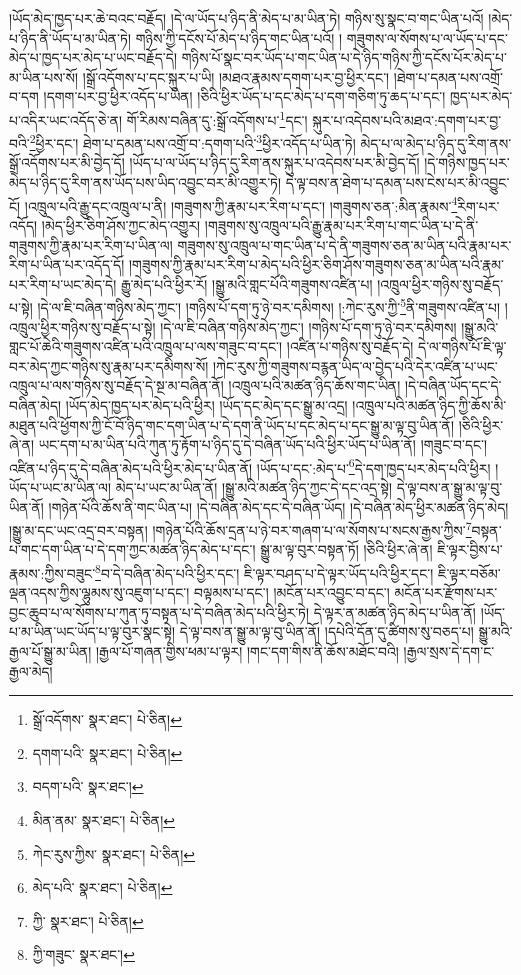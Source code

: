 །ཡོད་མེད་ཁྱད་པར་ཆེ་བའང་བརྗོད། །དེ་ལ་ཡོད་པ་ཉིད་ནི་མེད་པ་མ་ཡིན་ཏེ། གཉིས་སུ་སྣང་བ་གང་ཡིན་པའོ། །མེད་པ་ཉིད་ནི་ཡོད་པ་མ་ཡིན་ཏེ། གཉིས་ཀྱི་དངོས་པོ་མེད་པ་ཉིད་གང་ཡིན་པའོ། །
གཟུགས་ལ་སོགས་པ་ལ་ཡོད་པ་དང་མེད་པ་ཁྱད་པར་མེད་པ་ཡང་བརྗོད་དེ། གཉིས་པོ་སྣང་བར་ཡོད་པ་གང་ཡིན་པ་དེ་ཉིད་གཉིས་ཀྱི་དངོས་པོར་མེད་པ་མ་ཡིན་པས་སོ། །སྒྲོ་འདོགས་པ་དང་སྐུར་པ་ཡི། །མཐའ་རྣམས་དགག་པར་བྱ་ཕྱིར་དང་། །ཐེག་པ་དམན་པས་འགྲོ་བ་དག །དགག་པར་བྱ་ཕྱིར་འདོད་པ་ཡིན། །ཅིའི་ཕྱིར་ཡོད་པ་དང་མེད་པ་དག་གཅིག་ཏུ་ཆད་པ་དང་། ཁྱད་པར་མེད་པ་འདིར་ཡང་འདོད་ཅེ་ན། གོ་རིམས་བཞིན་དུ་:སྒྲོ་འདོགས་པ་\footnote{སྒྲོ་འདོགས་  སྣར་ཐང་།  པེ་ཅིན། }དང་། སྐུར་པ་འདེབས་པའི་མཐའ་:དགག་པར་བྱ་བའི་\footnote{དགག་པའི་  སྣར་ཐང་།  པེ་ཅིན། }ཕྱིར་དང་། ཐེག་པ་དམན་པས་འགྲོ་བ་:དགག་པའི་\footnote{བདག་པའི་  སྣར་ཐང་། }ཕྱིར་འདོད་པ་ཡིན་ཏེ། མེད་པ་ལ་མེད་པ་ཉིད་དུ་རིག་ནས་སྒྲོ་འདོགས་པར་མི་བྱེད་དོ། །ཡོད་པ་ལ་ཡོད་པ་ཉིད་དུ་རིག་ནས་སྐུར་པ་འདེབས་པར་མི་བྱེད་དོ། །དེ་གཉིས་ཁྱད་པར་མེད་པ་ཉིད་དུ་རིག་ནས་ཡོད་པས་ཡིད་འབྱུང་བར་མི་འགྱུར་ཏེ། དེ་ལྟ་བས་ན་ཐེག་པ་དམན་པས་ངེས་པར་མི་འབྱུང་ངོ། །འཁྲུལ་པའི་རྒྱུ་དང་འཁྲུལ་པ་ནི། །གཟུགས་ཀྱི་རྣམ་པར་རིག་པ་དང་། །གཟུགས་ཅན་:མིན་རྣམས་\footnote{མིན་ནམ་  སྣར་ཐང་།  པེ་ཅིན། }རིག་པར་འདོད། །མེད་ཕྱིར་ཅིག་ཤོས་ཀྱང་མེད་འགྱུར། །གཟུགས་སུ་འཁྲུལ་པའི་རྒྱུ་རྣམ་པར་རིག་པ་གང་ཡིན་པ་དེ་ནི་གཟུགས་ཀྱི་རྣམ་པར་རིག་པ་ཡིན་ལ། གཟུགས་སུ་འཁྲུལ་པ་གང་ཡིན་པ་དེ་ནི་གཟུགས་ཅན་མ་ཡིན་པའི་རྣམ་པར་རིག་པ་ཡིན་པར་འདོད་དོ། །གཟུགས་ཀྱི་རྣམ་པར་རིག་པ་མེད་པའི་ཕྱིར་ཅིག་ཤོས་གཟུགས་ཅན་མ་ཡིན་པའི་རྣམ་པར་རིག་པ་ཡང་མེད་དེ། རྒྱུ་མེད་པའི་ཕྱིར་རོ། །སྒྱུ་མའི་གླང་པོའི་གཟུགས་འཛིན་པ། །འཁྲུལ་ཕྱིར་གཉིས་སུ་བརྗོད་པ་སྟེ། །དེ་ལ་ཇི་བཞིན་གཉིས་མེད་ཀྱང་། །གཉིས་པོ་དག་ཏུ་ཉེ་བར་དམིགས། །:ཀེང་རུས་ཀྱི་\footnote{ཀེང་རུས་ཀྱིས་  སྣར་ཐང་།  པེ་ཅིན། }ནི་གཟུགས་འཛིན་པ། །འཁྲུལ་ཕྱིར་གཉིས་སུ་བརྗོད་པ་སྟེ། །དེ་ལ་ཇི་བཞིན་གཉིས་མེད་ཀྱང་། །གཉིས་པོ་དག་ཏུ་ཉེ་བར་དམིགས། །སྒྱུ་མའི་གླང་པོ་ཆེའི་གཟུགས་འཛིན་པའི་འཁྲུལ་པ་ལས་གཟུང་བ་དང་། །འཛིན་པ་གཉིས་སུ་བརྗོད་དེ། དེ་ལ་གཉིས་པོ་ཇི་ལྟ་བར་མེད་ཀྱང་གཉིས་སུ་རྣམ་པར་དམིགས་སོ། །ཀེང་རུས་ཀྱི་གཟུགས་བརྙན་ཡིད་ལ་བྱེད་པའི་དེར་འཛིན་པ་ཡང་འཁྲུལ་པ་ལས་གཉིས་སུ་བརྗོད་དེ་སྔ་མ་བཞིན་ནོ། །འཁྲུལ་པའི་མཚན་ཉིད་ཆོས་གང་ཡིན། །དེ་བཞིན་ཡོད་དང་དེ་བཞིན་མེད། །ཡོད་མེད་ཁྱད་པར་མེད་པའི་ཕྱིར། །ཡོད་དང་མེད་དང་སྒྱུ་མ་འདྲ། །འཁྲུལ་པའི་མཚན་ཉིད་ཀྱི་ཆོས་མི་མཐུན་པའི་ཕྱོགས་ཀྱི་ངོ་བོ་ཉིད་གང་དག་ཡིན་པ་དེ་དག་ནི་ཡོད་པ་དང་མེད་པ་དང་སྒྱུ་མ་ལྟ་བུ་ཡིན་ནོ། །ཅིའི་ཕྱིར་ཞེ་ན། ཡང་དག་པ་མ་ཡིན་པའི་ཀུན་ཏུ་རྟོག་པ་ཉིད་དུ་དེ་བཞིན་ཡོད་པའི་ཕྱིར་ཡོད་པ་ཡིན་ནོ། །གཟུང་བ་དང་། འཛིན་པ་ཉིད་དུ་དེ་བཞིན་མེད་པའི་ཕྱིར་མེད་པ་ཡིན་ནོ། །ཡོད་པ་དང་:མེད་པ་\footnote{མེད་པའི་  སྣར་ཐང་།  པེ་ཅིན། }དེ་དག་ཁྱད་པར་མེད་པའི་ཕྱིར། །ཡོད་པ་ཡང་མ་ཡིན་ལ། མེད་པ་ཡང་མ་ཡིན་ནོ། །སྒྱུ་མའི་མཚན་ཉིད་ཀྱང་དེ་དང་འདྲ་སྟེ། དེ་ལྟ་བས་ན་སྒྱུ་མ་ལྟ་བུ་ཡིན་ནོ། །གཉེན་པོའི་ཆོས་ནི་གང་ཡིན་པ། །དེ་བཞིན་མེད་དང་དེ་བཞིན་ཡོད། །དེ་བཞིན་མེད་ཕྱིར་མཚན་ཉིད་མེད། །སྒྱུ་མ་དང་ཡང་འདྲ་བར་བསྟན། །གཉེན་པོའི་ཆོས་དྲན་པ་ཉེ་བར་གཞག་པ་ལ་སོགས་པ་སངས་རྒྱས་ཀྱིས་\footnote{ཀྱི་  སྣར་ཐང་།  པེ་ཅིན། }བསྟན་པ་གང་དག་ཡིན་པ་དེ་དག་ཀྱང་མཚན་ཉིད་མེད་པ་དང་། སྒྱུ་མ་ལྟ་བུར་བསྟན་ཏོ། །ཅིའི་ཕྱིར་ཞེ་ན། ཇི་ལྟར་བྱིས་པ་རྣམས་:ཀྱིས་བཟུང་\footnote{ཀྱི་གཟུང་  སྣར་ཐང་། }བ་དེ་བཞིན་མེད་པའི་ཕྱིར་དང་། ཇི་ལྟར་བཤད་པ་དེ་ལྟར་ཡོད་པའི་ཕྱིར་དང་། ཇི་ལྟར་བཅོམ་ལྡན་འདས་ཀྱིས་ལྷུམས་སུ་འཇུག་པ་དང་། བལྟམས་པ་དང་། །མངོན་པར་འབྱུང་བ་དང་། མངོན་པར་རྫོགས་པར་བྱང་ཆུབ་པ་ལ་སོགས་པ་ཀུན་ཏུ་བསྟན་པ་དེ་བཞིན་མེད་པའི་ཕྱིར་ཏེ། དེ་ལྟར་ན་མཚན་ཉིད་མེད་པ་ཡིན་ནོ། །ཡོད་པ་མ་ཡིན་ཡང་ཡོད་པ་ལྟ་བུར་སྣང་སྟེ། དེ་ལྟ་བས་ན་སྒྱུ་མ་ལྟ་བུ་ཡིན་ནོ། །དཔེའི་དོན་དུ་ཚིགས་སུ་བཅད་པ། སྒྱུ་མའི་རྒྱལ་པོ་སྒྱུ་མ་ཡིན། །རྒྱལ་པོ་གཞན་གྱིས་ཕམ་པ་ལྟར། །གང་དག་གིས་ནི་ཆོས་མཐོང་བའི། །རྒྱལ་སྲས་དེ་དག་ང་རྒྱལ་མེད། 